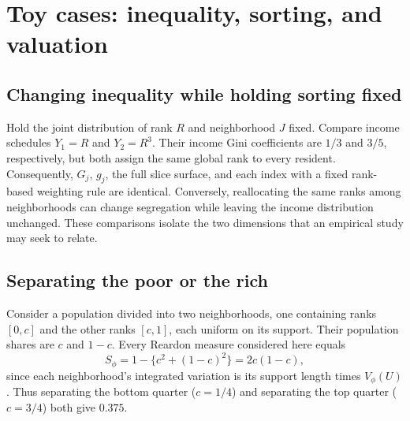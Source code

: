 \documentclass[11pt]{article}
\begin{document}
\section{Toy cases: inequality, sorting, and valuation}
\label{sec:examples}

\subsection{Changing inequality while holding sorting fixed}

Hold the joint distribution of rank $R$ and neighborhood $J$ fixed. Compare income schedules $Y_1=R$ and $Y_2=R^3$. Their income Gini coefficients are $1/3$ and $3/5$, respectively, but both assign the same global rank to every resident. Consequently, $G_j$, $g_j$, the full slice surface, and each index with a fixed rank-based weighting rule are identical. Conversely, reallocating the same ranks among neighborhoods can change segregation while leaving the income distribution unchanged. These comparisons isolate the two dimensions that an empirical study may seek to relate.

\subsection{Separating the poor or the rich}

Consider a population divided into two neighborhoods, one containing ranks $[0,c]$ and the other ranks $[c,1]$, each uniform on its support. Their population shares are $c$ and $1-c$. Every Reardon measure considered here equals
\[
S_\phi=1-\{c^2+(1-c)^2\}=2c(1-c),
\]
since each neighborhood's integrated variation is its support length times $V_\phi(U)$. Thus separating the bottom quarter ($c=1/4$) and separating the top quarter ($c=3/4$) both give $0.375$.
\end{document}
